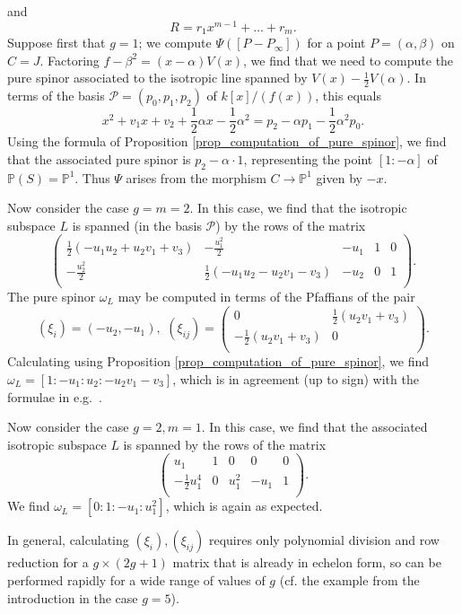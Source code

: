 \documentclass{article} %
\numberwithin{equation}{section}
\renewcommand{\P}{\mathbb{P}}
\begin{document}
and
\[ R = r_1 x^{m-1} + \dots + r_m. \]
Suppose first that $g = 1$; we compute $\Psi([P - P_\infty])$ for a point $P = (\alpha, \beta)$ on $C = J$. Factoring $f - \beta^2 = (x-\alpha)V(x)$, we find that we need to compute the pure spinor associated to the isotropic line spanned by $V(x) -\frac{1}{2} V(\alpha)$. In terms of the basis $\mathcal{P} = (p_0, p_1, p_2)$ of $k[x] / (f(x))$, this equals
\[ x^2 + v_1 x + v_2 + \frac{1}{2} \alpha x - \frac{1}{2} \alpha^2 = p_2 - \alpha p_1 - \frac{1}{2} \alpha^2 p_0. \]
Using the formula of Proposition \ref{prop_computation_of_pure_spinor}, we find that the associated pure spinor is $p_2 - \alpha \cdot 1$, representing the point $[1 : -\alpha]$ of $\P(S) = \P^1$. Thus $\Psi$ arises from the morphism $C \to \P^1$ given by $-x$.

Now consider the case $g = m = 2$. In this case, we find that the isotropic subspace $L$ is spanned (in the basis $\mathcal{P}$) by the rows of the matrix
\[ \left(
\begin{array}{ccccc}
 \frac{1}{2} (-u_1 u_2 + u_2 v_1+ v_3) & -\frac{u_1^2}{2} & -u_1 & 1 & 0 \\
 -\frac{u_2^2}{2} & \frac{1}{2} (-u_1 u_2 - u_2 v_1 - v_3) & -u_2 & 0 & 1 \\
\end{array}
\right). \]
The pure spinor $\omega_L$ may be computed in terms of the Pfaffians of the pair
\[ (\xi_i) = (-u_2, -u_1), \,\, (\xi_{ij}) = \left(
\begin{array}{cc}
 0 & \frac{1}{2} (u_2 v_1 + v_3) \\
 -\frac{1}{2} (u_2 v_1 + v_3) & 0 \\
\end{array}
\right). \]
Calculating using Proposition \ref{prop_computation_of_pure_spinor}, we find $\omega_L = [ 1 : -u_1 : u_2 : -u_2 v_1 - v_3 ]$, which is in agreement (up to sign) with the formulae in e.g.\ \cite[Ch. 4, \S 1]{CasselsFlynnProlegomena}.

Now consider the case $g = 2, m = 1$. In this case, we find that the associated isotropic subspace $L$ is spanned by the rows of the matrix
\[ \left(
\begin{array}{ccccc}
 u_1 & 1 & 0 & 0 & 0 \\
 -\frac{1}{2} u_1^4 & 0 & u_1^2 & -u_1 & 1 \\
\end{array}
\right). \]
We find $\omega_L = [ 0 : 1 : -u_1 : u_1^2 ]$, which is again as expected. 

In general, calculating $(\xi_i), (\xi_{ij})$ requires only polynomial division and row reduction for a $g \times (2g+1)$ matrix that is already in echelon form, so can be performed rapidly for a wide range of values of $g$ (cf. the example from the introduction in the case $g=5$).
\end{document}
